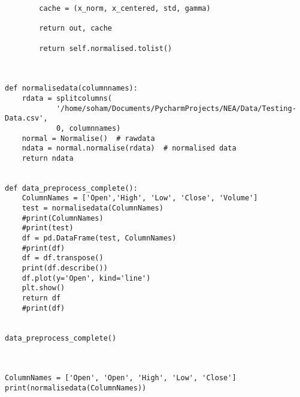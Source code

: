 \documentclass{article}
\begin{document}
\begin{lstlisting}
        cache = (x_norm, x_centered, std, gamma)

        return out, cache

        return self.normalised.tolist()



def normalisedata(columnnames):
    rdata = splitcolumns(
            '/home/soham/Documents/PycharmProjects/NEA/Data/Testing-Data.csv',
            0, columnnames)
    normal = Normalise()  # rawdata
    ndata = normal.normalise(rdata)  # normalised data
    return ndata


def data_preprocess_complete():
    ColumnNames = ['Open','High', 'Low', 'Close', 'Volume']
    test = normalisedata(ColumnNames)
    #print(ColumnNames)
    #print(test)
    df = pd.DataFrame(test, ColumnNames)
    #print(df)
    df = df.transpose()
    print(df.describe())
    df.plot(y='Open', kind='line')
    plt.show()
    return df
    #print(df)


data_preprocess_complete()



ColumnNames = ['Open', 'Open', 'High', 'Low', 'Close']
print(normalisedata(ColumnNames))


\end{lstlisting}
\clearpage
\end{document}
